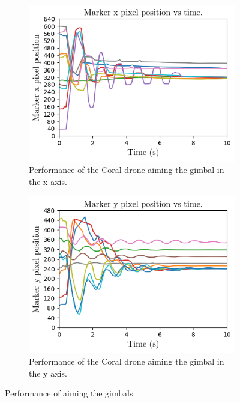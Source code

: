\begin{figure}
\begin{subfigure}[b]{0.49\textwidth}
    \end{subfigure}
        \begin{subfigure}[b]{0.49\textwidth}
        \centering
        \includegraphics[width=\textwidth]{images/coral_gimbal_performance_x_axis.png}
    \caption{Performance of the Coral drone aiming the gimbal in the x axis.}
    \label{fig:coral_gimbal_performance_x_axis}
    \end{subfigure}
    \begin{subfigure}[b]{0.49\textwidth}
        \centering
        \includegraphics[width=\textwidth]{images/coral_gimbal_performance_y_axis.png}
    \caption{Performance of the Coral drone aiming the gimbal in the y axis.}
    \label{fig:coral_gimbal_performance_y_axis}
    \end{subfigure}
    \caption{Performance of aiming the gimbals.}
    \label{fig:gimbal_aim_performance}
\end{figure}

